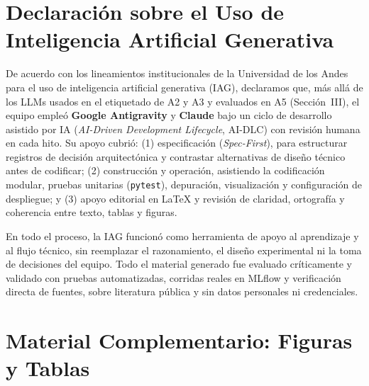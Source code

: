 \documentclass[conference]{IEEEtran}
\begin{document}
\section*{Declaración sobre el Uso de Inteligencia Artificial Generativa}

De acuerdo con los lineamientos institucionales de la Universidad de los Andes para el uso de inteligencia artificial generativa (IAG), declaramos que, más allá de los LLMs usados en el etiquetado de A2 y A3 y evaluados en A5 (Sección~III), el equipo empleó \textbf{Google Antigravity} y \textbf{Claude} bajo un ciclo de desarrollo asistido por IA (\textit{AI-Driven Development Lifecycle}, AI-DLC) con revisión humana en cada hito. Su apoyo cubrió: (1) especificación (\textit{Spec-First}), para estructurar registros de decisión arquitectónica y contrastar alternativas de diseño técnico antes de codificar; (2) construcción y operación, asistiendo la codificación modular, pruebas unitarias (\texttt{pytest}), depuración, visualización y configuración de despliegue; y (3) apoyo editorial en \LaTeX{} y revisión de claridad, ortografía y coherencia entre texto, tablas y figuras.

En todo el proceso, la IAG funcionó como herramienta de apoyo al aprendizaje y al flujo técnico, sin reemplazar el razonamiento, el diseño experimental ni la toma de decisiones del equipo. Todo el material generado fue evaluado críticamente y validado con pruebas automatizadas, corridas reales en MLflow y verificación directa de fuentes, sobre literatura pública y sin datos personales ni credenciales.




\clearpage
\onecolumn
\makeatletter
\setlength{\@fptop}{0pt}
\setlength{\@fpsep}{14pt}
\setlength{\@fpbot}{0pt plus 1fil}
\makeatother
\appendices
\section{Material Complementario: Figuras y Tablas}
\label{sec:anexo_figuras}
\end{document}
